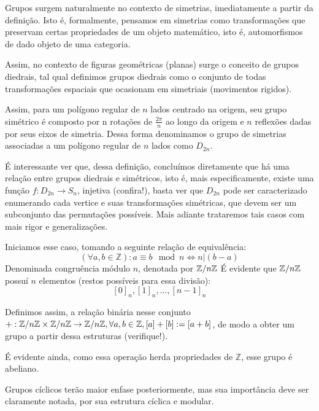 \documentclass[../main]{subfiles}
\begin{document}
\begin{definition}
    Grupos surgem naturalmente no contexto de simetrias, imediatamente a partir
    da definição. Isto é, formalmente, pensamos em simetrias como transformações
    que preservam certas propriedades de um objeto matemático, isto é,
    automorfismos de dado objeto de uma categoria. 
    
    Assim, no contexto de figuras geométricas (planas) surge o conceito de
    grupos diedrais, tal qual definimos grupos diedrais como o conjunto de todas
    transformações espaciais que ocasionam em simetriais (movimentos rigidos). 

    Assim, para um polígono regular de \(n\) lados centrado na origem, seu grupo
    simétrico é composto por n rotações de \(\frac{2\pi}{n}\) ao longo da origem
    e \(n\) reflexões dadas por seus eixos de simetria. Dessa forma denominamos
    o grupo de simetrias associadas a um polígono regular de \(n\) lados como
    \(D_{2n}\).
\end{definition}

É interessante ver que, dessa definição, concluímos diretamente que há uma
relação entre grupos diedrais e simétricos, isto é, mais especificamente, existe
uma função \(f: D_{2n} \to S_n\), injetiva (confira!),  basta ver que \(D_{2n}\)
pode ser caracterizado enumerando cada vertice e suas transformações simétricas,
que devem ser um subconjunto das permutações possíveis. Mais adiante trataremos
tais casos com mais rigor e generalizações.

\begin{definition}
    Iniciamos esse caso, tomando a seguinte relação de equivalência:
    \[(\forall a, b \in \mathbb Z): a \equiv b \mod n \iff n | (b - a)\]
    Denominada congruência módulo \(n\), denotada por \(\mathbb Z/ n\mathbb Z\) É evidente
    que \(\mathbb Z/ n\mathbb Z\) possuí \(n\) elementos (restos possíveis para essa
    divisão):
    \[[0]_n, [1]_n, ..., [n - 1]_n\]

    Definimos assim, a relação binária nesse conjunto \(+: \mathbb Z/ n\mathbb Z \times
    \mathbb Z/ n\mathbb Z \to \mathbb Z/ n\mathbb Z, \forall a, b \in \mathbb Z, [a] + [b] := [a + b]\),
    de modo a obter um grupo a partir dessa estruturas (verifique!).
    
    É evidente ainda, como essa operação herda propriedades de \(\mathbb Z\),
    esse grupo é abeliano.

    Grupos cíclicos terão maior enfase posteriormente, mas sua importância deve
    ser claramente notada, por sua estrutura cíclica e modular. 
\end{definition}
\end{document}

